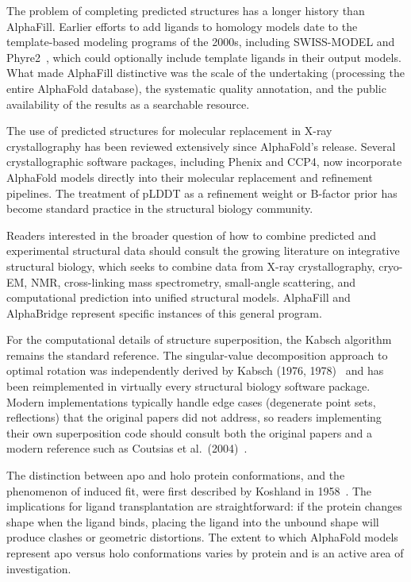 The problem of completing predicted structures has a longer history than AlphaFill. Earlier efforts to add ligands to homology models date to the template-based modeling programs of the 2000s, including SWISS-MODEL and Phyre2~\cite{waterhouse2018,kelley2015}, which could optionally include template ligands in their output models. What made AlphaFill distinctive was the scale of the undertaking (processing the entire AlphaFold database), the systematic quality annotation, and the public availability of the results as a searchable resource.

The use of predicted structures for molecular replacement in X-ray crystallography has been reviewed extensively since AlphaFold's release. Several crystallographic software packages, including Phenix and CCP4, now incorporate AlphaFold models directly into their molecular replacement and refinement pipelines. The treatment of pLDDT as a refinement weight or B-factor prior has become standard practice in the structural biology community.

Readers interested in the broader question of how to combine predicted and experimental structural data should consult the growing literature on integrative structural biology, which seeks to combine data from X-ray crystallography, cryo-EM, NMR, cross-linking mass spectrometry, small-angle scattering, and computational prediction into unified structural models. AlphaFill and AlphaBridge represent specific instances of this general program.

For the computational details of structure superposition, the Kabsch algorithm remains the standard reference. The singular-value decomposition approach to optimal rotation was independently derived by Kabsch (1976, 1978)~\cite{kabsch1976,kabsch1978} and has been reimplemented in virtually every structural biology software package. Modern implementations typically handle edge cases (degenerate point sets, reflections) that the original papers did not address, so readers implementing their own superposition code should consult both the original papers and a modern reference such as Coutsias et al.\ (2004)~\cite{coutsias2004}.

The distinction between apo and holo protein conformations, and the phenomenon of induced fit, were first described by Koshland in 1958~\cite{koshland1958}. The implications for ligand transplantation are straightforward: if the protein changes shape when the ligand binds, placing the ligand into the unbound shape will produce clashes or geometric distortions. The extent to which AlphaFold models represent apo versus holo conformations varies by protein and is an active area of investigation.
